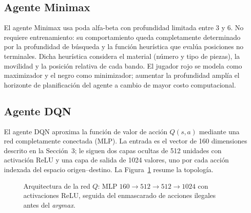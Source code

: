 \documentclass[11pt,a4paper]{article}
\begin{document}
\subsection{Agente Minimax}

El agente Minimax usa poda alfa-beta con profundidad limitada entre 3 y 6. No requiere entrenamiento: su comportamiento queda completamente determinado por la profundidad de búsqueda y la función heurística que evalúa posiciones no terminales. Dicha heurística considera el material (número y tipo de piezas), la movilidad y la posición relativa de cada bando. El jugador rojo se modela como maximizador y el negro como minimizador; aumentar la profundidad amplía el horizonte de planificación del agente a cambio de mayor costo computacional.

\subsection{Agente DQN}

El agente DQN aproxima la función de valor de acción $Q(s,a)$ mediante una red completamente conectada (MLP). La entrada es el vector de 160 dimensiones descrito en la Sección~3; le siguen dos capas ocultas de 512 unidades con activación ReLU y una capa de salida de 1024 valores, uno por cada acción indexada del espacio origen--destino. La Figura~\ref{fig:arquitectura} resume la topología.

\begin{figure}[H]
\centering
{}
\caption{Arquitectura de la red $Q$: MLP $160\rightarrow512\rightarrow512\rightarrow1024$ con activaciones ReLU, seguida del enmascarado de acciones ilegales antes del \textit{argmax}.}
\label{fig:arquitectura}
\end{figure}
\end{document}
